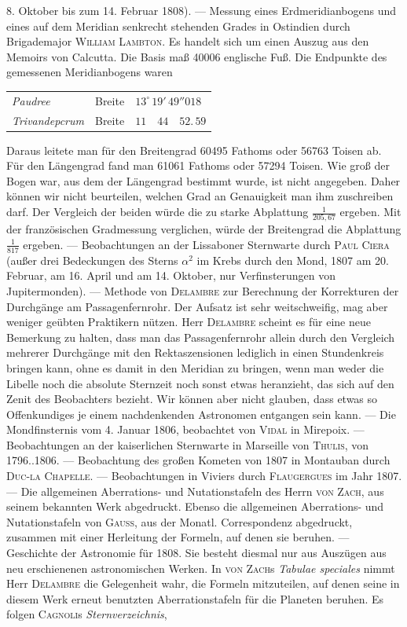 8. Oktober bis zum 14. Februar 1808). — Messung eines Erdmeridianbogens und eines auf dem Meridian senkrecht stehenden Grades in Ostindien durch Brigademajor \textsc{William Lambton}. Es handelt sich um einen Auszug aus den Memoirs von Calcutta. Die Basis maß 40006 englische Fuß. Die Endpunkte des gemessenen Meridianbogens waren

\begin{center}\begin{tabular}{@{}lll@{}}\emph{Paudree} & Breite & $13^\circ\,19'\,49''018$ \\ \emph{Trivandepcrum} & Breite & $11\quad44\quad52.\,59$ \\ \end{tabular}\end{center}
\noindent Daraus leitete man für den Breitengrad 60495 Fathoms oder 56763 Toisen ab. Für den Längengrad fand man 61061 Fathoms oder 57294 Toisen. Wie groß der Bogen war, aus dem der Längengrad bestimmt wurde, ist nicht angegeben. Daher können wir nicht beurteilen, welchen Grad an Genauigkeit man ihm zuschreiben darf. Der Vergleich der beiden würde die zu starke Abplattung $\frac{1}{205,67}$ ergeben. Mit der französischen Gradmessung verglichen, würde der Breitengrad die Abplattung $\frac{1}{817}$ ergeben. — Beobachtungen an der Lissaboner Sternwarte durch \textsc{Paul Ciera} (außer drei Bedeckungen des Sterns $\alpha^2$ im Krebs durch den Mond, 1807 am 20. Februar, am 16. April und am 14. Oktober, nur Verfinsterungen von Jupitermonden). — Methode von \textsc{Delambre} zur Berechnung der Korrekturen der Durchgänge am Passagenfernrohr. Der Aufsatz ist sehr weitschweifig, mag aber weniger geübten Praktikern nützen. Herr \textsc{Delambre} scheint es für eine neue Bemerkung zu halten, dass man das Passagenfernrohr allein durch den Vergleich mehrerer Durchgänge mit den Rektaszensionen lediglich in einen Stundenkreis bringen kann, ohne es damit in den Meridian zu bringen, wenn man weder die Libelle noch die absolute Sternzeit noch sonst etwas heranzieht, das sich auf den Zenit des Beobachters bezieht. Wir können aber nicht glauben, dass etwas so Offenkundiges je einem nachdenkenden Astronomen entgangen sein kann. — Die Mondfinsternis vom 4. Januar 1806, beobachtet von \textsc{Vidal} in Mirepoix. — Beobachtungen an der kaiserlichen Sternwarte in Marseille von \textsc{Thulis}, von 1796..1806. — Beobachtung des großen Kometen von 1807 in Montauban durch \textsc{Duc-la Chapelle}. — Beobachtungen in Viviers durch \textsc{Flaugergues} im Jahr 1807. — Die allgemeinen Aberrations- und Nutationstafeln des Herrn \textsc{von Zach}, aus seinem bekannten Werk abgedruckt. Ebenso die allgemeinen Aberrations- und Nutationstafeln von \textsc{Gauss}, aus der Monatl. Correspondenz abgedruckt, zusammen mit einer Herleitung der Formeln, auf denen sie beruhen. — Geschichte der Astronomie für 1808. Sie besteht diesmal nur aus Auszügen aus neu erschienenen astronomischen Werken. In \textsc{von Zach}s \emph{Tabulae speciales} nimmt Herr \textsc{Delambre} die Gelegenheit wahr, die Formeln mitzuteilen, auf denen seine in diesem Werk erneut benutzten Aberrationstafeln für die Planeten beruhen. Es folgen \textsc{Cagnoli}s \emph{Sternverzeichnis}, 